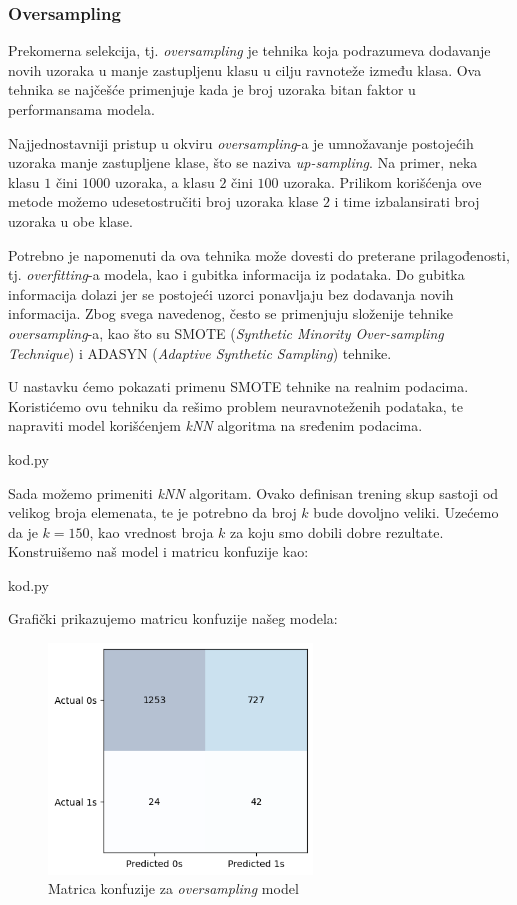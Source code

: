 \documentclass[12pt]{article}
\theoremstyle{definition}
\theoremstyle{remark}
\begin{document}
\subsubsection{Oversampling}

Prekomerna selekcija, tj. \emph{oversampling} je tehnika koja podrazumeva dodavanje novih uzoraka u manje zastupljenu klasu u cilju ravnoteže između klasa. Ova tehnika se najčešće primenjuje kada je broj uzoraka bitan faktor u performansama modela.

Najjednostavniji pristup u okviru \emph{oversampling}-a je umnožavanje postojećih uzoraka manje zastupljene klase, što se naziva \emph{up-sampling}. Na primer, neka klasu $1$ čini $1000$ uzoraka, a klasu $2$ čini $100$ uzoraka. Prilikom korišćenja ove metode možemo udesetostručiti broj uzoraka klase $2$ i time izbalansirati broj uzoraka u obe klase. 

Potrebno je napomenuti da ova tehnika može dovesti do preterane prilagođenosti, tj. \emph{overfitting}-a modela, kao i gubitka informacija iz podataka. Do gubitka informacija dolazi jer se postojeći uzorci ponavljaju bez dodavanja novih informacija. Zbog svega navedenog, često se primenjuju složenije tehnike \emph{oversampling}-a, kao što su SMOTE (\emph{Synthetic Minority Over-sampling Technique}) i ADASYN (\emph{Adaptive Synthetic Sampling}) tehnike.

U nastavku ćemo pokazati primenu SMOTE tehnike na realnim podacima. Koristićemo ovu tehniku da rešimo problem neuravnoteženih podataka, te napraviti model korišćenjem \emph{kNN} algoritma na sređenim podacima. 


\hfill

{kod.py}

\hfill

Sada možemo primeniti \emph{kNN} algoritam. Ovako definisan trening skup sastoji od velikog broja elemenata, te je potrebno da broj $k$ bude dovoljno veliki.  Uzećemo da je $k=150$, kao vrednost broja $k$ za koju smo dobili dobre rezultate. Konstruišemo naš model i matricu konfuzije kao:

\hfill

{kod.py}

\hfill

Grafički prikazujemo matricu konfuzije našeg modela:

\begin{figure}[htp]
    \centering
    \includegraphics[width=7cm]{output_27_0.png}
    \caption{Matrica konfuzije za \emph{oversampling} model}
    \label{fig:galaxy}
\end{figure}
\end{document}
